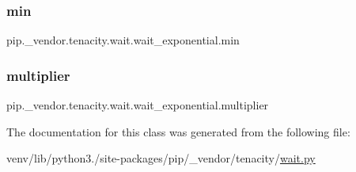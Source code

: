 \subsubsection{\texorpdfstring{min}{min}}
{\footnotesize\ttfamily pip.\+\_\+vendor.\+tenacity.\+wait.\+wait\+\_\+exponential.\+min\hspace{0.3cm}{\ttfamily [static]}}

\mbox{\label{classpip_1_1__vendor_1_1tenacity_1_1wait_1_1wait__exponential_aad2e12fc1f18347de41ac288fa9d55f4}} 
\subsubsection{\texorpdfstring{multiplier}{multiplier}}
{\footnotesize\ttfamily pip.\+\_\+vendor.\+tenacity.\+wait.\+wait\+\_\+exponential.\+multiplier\hspace{0.3cm}{\ttfamily [static]}}



The documentation for this class was generated from the following file\+:\begin{DoxyCompactItemize}
\item 
venv/lib/python3./site-\/packages/pip/\+\_\+vendor/tenacity/\hyperlink{tenacity_2wait_8py}{wait.\+py}\end{DoxyCompactItemize}
